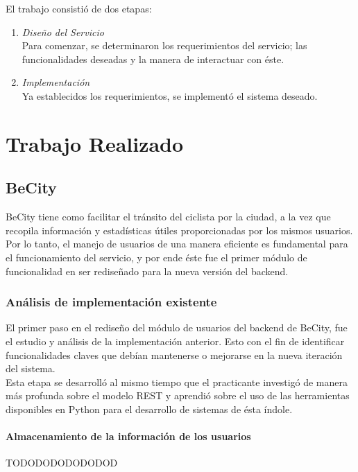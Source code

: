 \documentclass[11pt,letterpaper]{article}
\begin{document}
El trabajo consistió de dos etapas:
\begin{enumerate}
    \item \emph{Diseño del Servicio}\\ Para comenzar, se determinaron los requerimientos del servicio; las funcionalidades deseadas y la manera de interactuar con éste.
    \item \emph{Implementación}\\ Ya establecidos los requerimientos, se implementó el sistema deseado.
\end{enumerate}

\newpage
\section{Trabajo Realizado}

\subsection{BeCity}

BeCity tiene como facilitar el tránsito del ciclista por la ciudad, a la vez que recopila información y estadísticas útiles proporcionadas por los mismos usuarios. Por lo tanto, el manejo de usuarios de una manera eficiente es fundamental para el funcionamiento del servicio, y por ende éste fue el primer módulo de funcionalidad en ser rediseñado para la nueva versión del backend.

\subsubsection{Análisis de implementación existente}

El primer paso en el rediseño del módulo de usuarios del backend de BeCity, fue el estudio y análisis de la implementación anterior. Esto con el fin de identificar funcionalidades claves que debían mantenerse o mejorarse en la nueva iteración del sistema.\\
Esta etapa se desarrolló al mismo tiempo que el practicante investigó de manera más profunda sobre el modelo REST y aprendió sobre el uso de las herramientas disponibles en Python para el desarrollo de sistemas de ésta índole.

\paragraph{Almacenamiento de la información de los usuarios}
TODODODODODODOD
\end{document}
